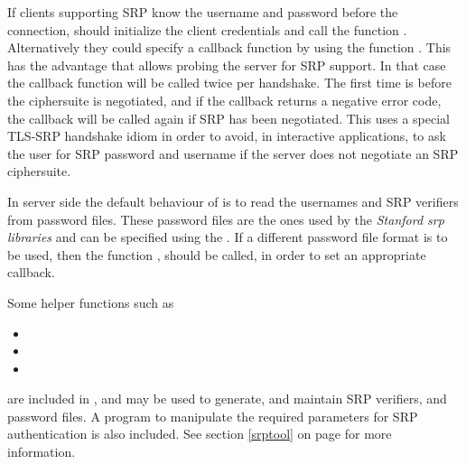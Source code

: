 If clients supporting SRP know the username and password before the connection,
should initialize the client credentials and call the
function .
Alternatively they could specify a callback function by using the
function .
This has the advantage that allows probing the server for SRP support.
In that case the callback function will be called twice per handshake.
The first time is before the ciphersuite is negotiated, and 
if the callback returns a negative error code, the callback will be 
called again if SRP has been negotiated. 
This uses a special TLS-SRP handshake idiom in order to avoid, in
interactive applications, to ask the user for SRP password and username 
if the server does not negotiate an SRP ciphersuite.
\par
In server side the default behaviour of \gnutls{} is to read the usernames 
and SRP verifiers from password files. These password files are the ones used
by the \emph{Stanford srp libraries} and can be specified using the
.
If a different password file format is to be used, then the 
function ,
should be called, in order to set an appropriate callback.
\par
Some helper functions such as
\begin{itemize}
\item {}
\item {}
\item {}
\end{itemize}
are included in \gnutls{}, and may be used to generate, and maintain
SRP verifiers, and password files. 
A program to manipulate the required parameters 
for SRP authentication is also included. See section \ref{srptool} on 
page \pageref{srptool} for more information.

